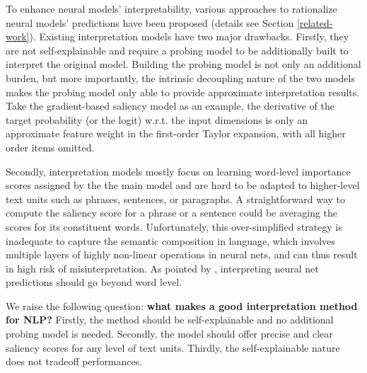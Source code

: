 \documentclass[11pt,a4paper]{article}
\begin{document}
To enhance neural models' interpretability, various approaches to rationalize neural models' predictions have been proposed (details see Section \ref{related-work}). 
Existing interpretation models have two major drawbacks. Firstly, they are not self-explainable and require 
a  
 probing model  to be additionally built to interpret the original model. 
 Building the probing model is not only an additional burden, but more importantly, 
 the intrinsic decoupling nature of the two models makes  
 the probing model only able to provide approximate interpretation results. 
 Take the gradient-based saliency model \cite{simonyan2013deep,li2015visualizing,selvaraju2017grad} as an example, the  derivative of the target probability (or the logit) w.r.t. the input dimensions is only 
 an approximate feature weight 
  in the
  first-order Taylor expansion, with all higher  order items omitted. 

Secondly, interpretation models mostly focus on
learning 
 word-level importance scores assigned by the  the main model 
  and are hard to be adapted to higher-level text units such as phrases, sentences, or paragraphs. A straightforward way to compute the saliency score for a phrase or a sentence could be averaging the scores for its constituent words. 
Unfortunately, this over-simplified strategy is inadequate to capture the 
 semantic composition in language, which  
  involves multiple layers of highly non-linear operations in neural nets, and can thus result in high risk of misinterpretation. 
  As pointed by , interpreting neural net predictions should go beyond word level. 

We raise the following question: {\bf what makes a good interpretation method for NLP?}
Firstly,  the method should be self-explainable and no additional probing model is needed.
Secondly, the model should offer precise and clear saliency scores for any level of text units. 
Thirdly, the self-explainable nature does not tradeoff performances.
\end{document}
